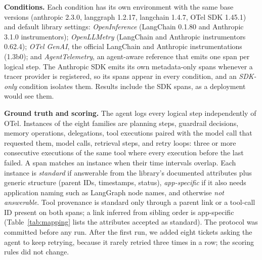 \documentclass[conference]{IEEEtran}
\begin{document}
\textbf{Conditions.} Each condition has its own environment with the
same base versions (anthropic 2.3.0, langgraph 1.2.17, langchain
1.4.7, OTel SDK 1.45.1) and default library settings: \emph{OpenInference}
(LangChain 0.1.80 and Anthropic 3.1.0 instrumentors); \emph{OpenLLMetry}
(LangChain and Anthropic instrumentors 0.62.4); \emph{OTel GenAI}, the
official LangChain and Anthropic instrumentations (1.3b0); and
\emph{AgentTelemetry}, an agent-aware reference that emits one span per
logical step. The Anthropic SDK emits its own metadata-only spans
whenever a tracer provider is registered, so its spans appear in every
condition, and an \emph{SDK-only} condition isolates them. Results
include the SDK spans, as a deployment would see them.

\textbf{Ground truth and scoring.} The agent logs every logical step
independently of OTel. Instances of the eight families are planning
steps, guardrail decisions, memory operations, delegations, tool
executions paired with the model call that requested them, model calls,
retrieval steps, and retry loops: three or more consecutive executions
of the same tool where every execution before the last failed. A span
matches an instance when their time intervals overlap. Each instance is
\emph{standard} if answerable from the library's documented attributes
plus generic structure (parent IDs, timestamps, status),
\emph{app-specific} if it also needs application naming such as
LangGraph node names, and otherwise \emph{not answerable}. Tool
provenance is standard only through a parent link or a tool-call ID
present on both spans; a link inferred from sibling order is
app-specific (Table~\ref{tab:mapping} lists the attributes accepted as
standard). The protocol was committed before any run. After the
first run, we added eight tickets asking the agent to keep retrying,
because it rarely retried three times in a row; the scoring rules did
not change.
\end{document}
